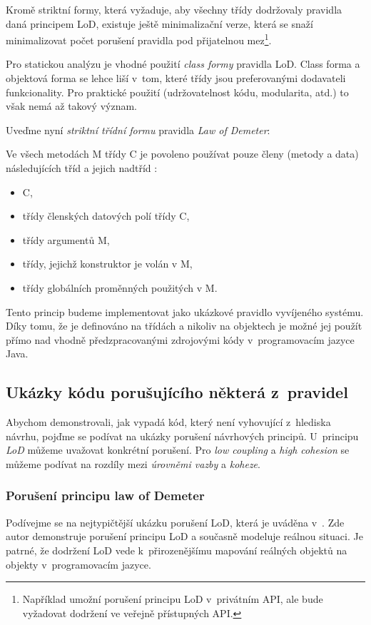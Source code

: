 Kromě striktní formy, která vyžaduje, aby všechny třídy dodržovaly pravidla daná principem LoD, existuje ještě minimalizační verze, která se snaží minimalizovat počet porušení pravidla pod přijatelnou mez\footnote{Například umožní porušení principu LoD v~privátním API, ale bude vyžadovat dodržení ve veřejně přístupných API.}.

Pro statickou analýzu je vhodné použití \emph{class formy} pravidla LoD. Class forma a objektová forma se lehce liší v~tom, které třídy jsou preferovanými dodavateli funkcionality. Pro praktické použití (udržovatelnost kódu, modularita, atd.) to však nemá až takový význam.

Uveďme nyní \emph{striktní třídní formu} pravidla \emph{Law of Demeter}:

\begin{designprinciple}
  Ve všech metodách M třídy C je povoleno používat pouze členy (metody a data) následujících tříd a jejich nadtříd \cite{35588}:
  \begin{itemize}
  \item C,
  \item třídy členských datových polí třídy C,
  \item třídy argumentů M,
  \item třídy, jejichž konstruktor je volán v M,
  \item třídy globálních proměnných použitých v M.
  \end{itemize}
\end{designprinciple}

Tento princip budeme implementovat jako ukázkové pravidlo vyvíjeného systému. Díky tomu, že je definováno na třídách a nikoliv na objektech je možné jej použít přímo nad vhodně předzpracovanými zdrojovými kódy v~programovacím jazyce Java.

\subsection{Ukázky kódu porušujícího některá z~pravidel}
Abychom demonstrovali, jak vypadá kód, který není vyhovující z~hlediska návrhu, pojďme se podívat na ukázky porušení návrhových principů. U~principu \emph{LoD} můžeme uvažovat konkrétní porušení. Pro \emph{low coupling} a \emph{high cohesion} se můžeme podívat na rozdíly mezi \emph{úrovněmi vazby} a \emph{koheze}.

\subsubsection{Porušení principu law of Demeter}
Podívejme se na nejtypičtější ukázku porušení LoD, která je uváděna v~\cite{lod:paperboy}. Zde autor demonstruje porušení principu LoD a současně modeluje reálnou situaci. Je patrné, že dodržení LoD vede k~přirozenějšímu mapování reálných objektů na objekty v~programovacím jazyce.

